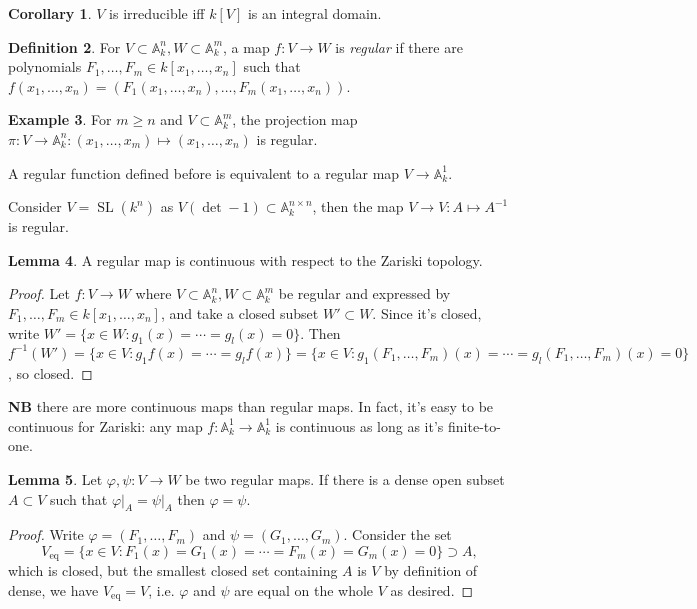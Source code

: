 \documentclass{article}
\newcommand{\A}{\mathbb{A}}
\newcommand{\SL}{\operatorname{SL}}
\theoremstyle{definition}
\newtheorem{defn}{Definition}[subsection]
\newtheorem{lemma}[defn]{Lemma}
\newtheorem{coro}[defn]{Corollary}
\newtheorem{example}[defn]{Example}
\begin{document}
\begin{coro}
$V$ is irreducible iff $k[V]$ is an integral domain.
\end{coro}

\begin{defn}
For $V\subset\A_k^n,W\subset\A_k^m$, a map $f:V\rightarrow W$ is \textit{regular} if there are polynomials $F_1,\ldots,F_m\in k[x_1,\ldots,x_n]$ such that $f(x_1,\ldots,x_n)=(F_1(x_1,\ldots,x_n),\ldots,F_m(x_1,\ldots,x_n))$.
\end{defn}

\begin{example}
For $m\geq n$ and $V\subset\A_k^m$, the projection map $\pi:V\rightarrow\A_k^n:(x_1,\ldots,x_m)\mapsto (x_1,\ldots,x_n)$ is regular.

A regular function defined before is equivalent to a regular map $V\rightarrow\A_k^1$.

Consider $V=\SL(k^n)$ as $V(\det-1)\subset\A_k^{n\times n}$, then the map $V\rightarrow V:A\mapsto A^{-1}$ is regular.
\end{example}

\begin{lemma}
\label{lemma:regcontaff}
A regular map is continuous with respect to the Zariski topology.
\end{lemma}
\begin{proof}
Let $f:V\rightarrow W$ where $V\subset\A_k^n,W\subset\A_k^m$ be regular and expressed by $F_1,\ldots,F_m\in k[x_1,\ldots,x_n]$, and take a closed subset $W'\subset W$. Since it's closed, write $W'=\{x\in W:g_1(x)=\cdots=g_l(x)=0\}$. Then $f^{-1}(W')=\{x\in V:g_1f(x)=\cdots=g_lf(x)\}=\{x\in V:g_1(F_1,\ldots,F_m)(x)=\cdots=g_l(F_1,\ldots,F_m)(x)=0\}$, so closed.
\end{proof}

\textbf{NB} there are more continuous maps than regular maps. In fact, it's easy to be continuous for Zariski: any map $f:\A_k^1\rightarrow\A_k^1$ is continuous as long as it's finite-to-one.

\begin{lemma}
\label{lemma:denseequalaffine}
Let $\varphi,\psi:V\rightarrow W$ be two regular maps. If there is a dense open subset $A\subset V$ such that $\left.\varphi\right|_A=\left.\psi\right|_A$ then $\varphi=\psi$.
\end{lemma}
\begin{proof}
Write $\varphi=(F_1,\ldots,F_m)$ and $\psi=(G_1,\ldots,G_m)$. Consider the set
\[
V_{\operatorname{eq}}=\{x\in V:F_1(x)=G_1(x)=\cdots=F_m(x)=G_m(x)=0\}\supset A,
\]
which is closed, but the smallest closed set containing $A$ is $V$ by definition of dense, we have $V_{\operatorname{eq}}=V$, i.e. $\varphi$ and $\psi$ are equal on the whole $V$ as desired.
\end{proof}
\end{document}
